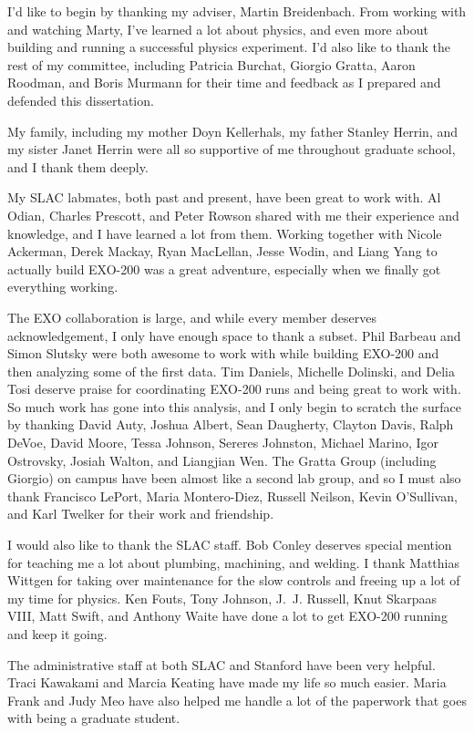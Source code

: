 I'd like to begin by thanking my adviser, Martin Breidenbach. From working with and watching Marty, I've learned a lot about physics, and even more about building and running a successful physics experiment. I'd also like to thank the rest of my committee, including Patricia Burchat, Giorgio Gratta, Aaron Roodman, and Boris Murmann for their time and feedback as I prepared and defended this dissertation.

My family, including my mother Doyn Kellerhals, my father Stanley Herrin, and my sister Janet Herrin were all so supportive of me throughout graduate school, and I thank them deeply. 

My SLAC labmates, both past and present, have been great to work with. Al Odian, Charles Prescott, and Peter Rowson shared with me their experience and knowledge, and I have learned a lot from them. Working together with Nicole Ackerman, Derek Mackay, Ryan MacLellan, Jesse Wodin, and Liang Yang to actually build EXO-200 was a great adventure, especially when we finally got everything working.

The EXO collaboration is large, and while every member deserves acknowledgement, I only have enough space to thank a subset. Phil Barbeau and Simon Slutsky were both awesome to work with while building EXO-200 and then analyzing some of the first data. Tim Daniels, Michelle Dolinski, and Delia Tosi deserve praise for coordinating EXO-200 runs and being great to work with. So much work has gone into this analysis, and I only begin to scratch the surface by thanking David Auty, Joshua Albert, Sean Daugherty, Clayton Davis, Ralph DeVoe, David Moore, Tessa Johnson, Sereres Johnston, Michael Marino, Igor Ostrovsky, Josiah Walton, and Liangjian Wen. The Gratta Group (including Giorgio) on campus have been almost like a second lab group, and so I must also thank Francisco LePort, Maria Montero-Diez, Russell Neilson, Kevin O'Sullivan, and Karl Twelker for their work and friendship.

I would also like to thank the SLAC staff. Bob Conley deserves special mention for teaching me a lot about plumbing, machining, and welding. I thank Matthias Wittgen for taking over maintenance for the slow controls and freeing up a lot of my time for physics. Ken Fouts, Tony Johnson, J.~J. Russell, Knut Skarpaas VIII, Matt Swift, and Anthony Waite have done a lot to get EXO-200 running and keep it going.

The administrative staff at both SLAC and Stanford have been very helpful. Traci Kawakami and Marcia Keating have made my life so much easier. Maria Frank and Judy Meo have also helped me handle a lot of the paperwork that goes with being a graduate student.


